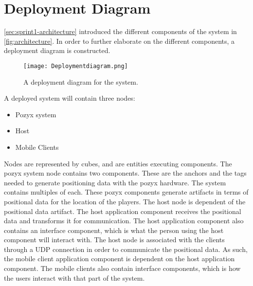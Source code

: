 \section{Deployment Diagram}\label{sec:sprint2-deploymentdia}
\autoref{sec:sprint1-architecture} introduced the different components of the system in \autoref{fig:architecture}.
In order to further elaborate on the different components, a deployment diagram is constructed.
\begin{figure}[H]
    \centering
    \texttt{[image: Deploymentdiagram.png]}
    \caption{A deployment diagram for the system.}
    \label{fig:sprint2-deployment}
\end{figure}
\noindent
A deployed system will contain three nodes:
\begin{itemize}
    \item Pozyx system
    \item Host
    \item Mobile Clients
\end{itemize}
Nodes are represented by cubes, and are entities executing components.
The pozyx system node contains two components.
These are the anchors and the tags needed to generate positioning data with the pozyx hardware.
The system contains multiples of each.
These pozyx components generate artifacts in terms of positional data for the location of the players.
The host node is dependent of the positional data artifact.
The host application component receives the positional data and transforms it for communication.
The host application component also contains an interface component, which is what the person using the host component will interact with.
The host node is associated with the clients through a UDP connection in order to communicate the positional data.
As such, the mobile client application component is dependent on the host application component.
The mobile clients also contain interface components, which is how the users interact with that part of the system.